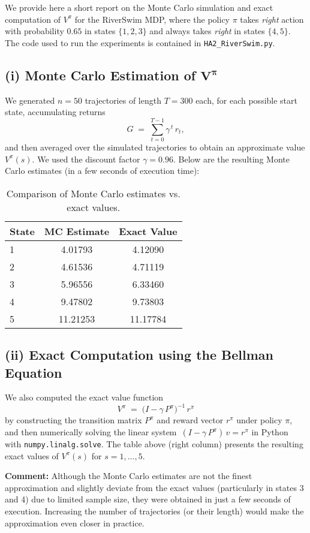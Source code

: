We provide here a short report on the Monte Carlo simulation and exact computation of 
\(V^\pi\) for the RiverSwim MDP, where the policy \(\pi\) takes \emph{right} action 
with probability \(0.65\) in states \(\{1,2,3\}\) and always takes \emph{right} 
in states \(\{4,5\}\). 
The code used to run the experiments is contained in 
\texttt{HA2\_RiverSwim.py}.

\medskip

\noindent
\subsection*{(i) Monte Carlo Estimation of \(\boldsymbol{V^\pi}\)}

\noindent
We generated \(n=50\) trajectories of length \(T=300\) each, for each possible start state, 
accumulating returns
\[
  G \;=\;\sum_{t=0}^{T-1}\gamma^{\,t}\,r_t,
\]
and then averaged over the simulated trajectories to obtain 
an approximate value \(V^\pi(s)\). 
We used the discount factor \(\gamma = 0.96\). 
Below are the resulting Monte Carlo estimates (in a few seconds of execution time):

\begin{table}[h!]
  \centering
  \begin{tabular}{l|c|c}
  \hline
  \textbf{State} & \textbf{MC Estimate} & \textbf{Exact Value} \\
  \hline
  1 & 4.01793 & 4.12090 \\
  2 & 4.61536 & 4.71119 \\
  3 & 5.96556 & 6.33460 \\
  4 & 9.47802 & 9.73803 \\
  5 & 11.21253 & 11.17784 \\
  \hline
  \end{tabular}
  \caption{Comparison of Monte Carlo estimates vs. exact values.}
  \label{tab:mc-vs-exact}
\end{table}
  

\noindent
\subsection*{(ii) Exact Computation using the Bellman Equation}

\noindent
We also computed the exact value function 
\[
   V^\pi \;=\;\bigl(I - \gamma\,P^\pi\bigr)^{-1}\,r^\pi
\]
by constructing the transition matrix \(P^\pi\) and reward vector \(r^\pi\) under policy 
\(\pi\), and then numerically solving the linear system 
\(\,(I - \gamma\,P^\pi)\,v = r^\pi\) in Python with \texttt{numpy.linalg.solve}. 
The table above (right column) presents the resulting exact values of 
\(V^\pi(s)\) for \(s=1,\dots,5.\)

\medskip

\noindent
\textbf{Comment:} 
Although the Monte Carlo estimates are not the finest approximation and slightly deviate 
from the exact values (particularly in states 3 and 4) due to limited sample size, 
they were obtained in just a few seconds of execution. Increasing the number of trajectories 
(or their length) would make the approximation even closer in practice.